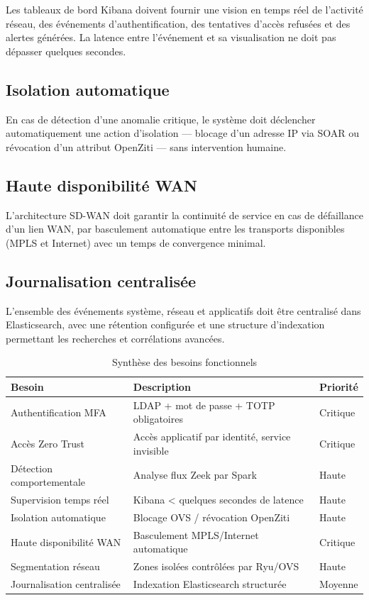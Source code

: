 \documentclass[12pt,a4paper,oneside]{report}
\begin{document}
	Les tableaux de bord Kibana doivent fournir une vision en temps réel de
	l'activité réseau, des événements d'authentification, des tentatives d'accès
	refusées et des alertes générées. La latence entre l'événement et sa
	visualisation ne doit pas dépasser quelques secondes.
	
	\subsection{Isolation automatique}
	
	En cas de détection d'une anomalie critique, le système doit déclencher
	automatiquement une action d'isolation --- blocage d'un adresse IP via SOAR
	ou révocation d'un attribut OpenZiti --- sans intervention humaine.
	
	\subsection{Haute disponibilité WAN}
	
	L'architecture SD-WAN doit garantir la continuité de service en cas de
	défaillance d'un lien WAN, par basculement automatique entre les transports
	disponibles (MPLS et Internet) avec un temps de convergence minimal.
	\subsection{Journalisation centralisée}
	
	L'ensemble des événements système, réseau et applicatifs doit être centralisé
	dans Elasticsearch, avec une rétention configurée et une structure d'indexation
	permettant les recherches et corrélations avancées.
	
	\begin{table}[H]
		\centering
		\caption{Synthèse des besoins fonctionnels}
		\renewcommand{\arraystretch}{1.4}
		\begin{tabularx}{\textwidth}{|l|X|l|}
			\hline
			\textbf{Besoin} & \textbf{Description} & \textbf{Priorité} \\
			\hline
			Authentification MFA & LDAP + mot de passe + TOTP obligatoires & Critique \\
			\hline
			Accès Zero Trust & Accès applicatif par identité, service invisible & Critique \\
			\hline
			Détection comportementale & Analyse flux Zeek par Spark & Haute \\
			\hline
			Supervision temps réel & Kibana < quelques secondes de latence & Haute \\
			\hline
			Isolation automatique & Blocage OVS / révocation OpenZiti & Haute \\
			\hline
			Haute disponibilité WAN & Basculement MPLS/Internet automatique & Critique \\
			\hline
			Segmentation réseau & Zones isolées contrôlées par Ryu/OVS & Haute \\
			\hline
			Journalisation centralisée & Indexation Elasticsearch structurée & Moyenne \\
			\hline
		\end{tabularx}
	\end{table}
	
\end{document}
